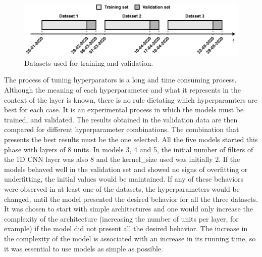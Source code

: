 \begin{figure}[h!]
    \centering
    \begin{center}
    \includegraphics[width=1\textwidth]{Images/hyptun.png}
    \caption{Datasets used for training and validation.}
    \label{hyptun}
    \end{center}
\end{figure}

The process of tuning hyperparators is a long and time consuming process. Although the meaning of each hyperparameter and what it represents in the context of the layer is known, there is no rule dictating which hyperparamters are best for each case. It is an experimental process in which the models must be trained, and validated. The results obtained in the validation data are then compared for different hyperparameter combinations. The combination that presents the best results must be the one selected. All the five models started this phase with layers of 8 units. In models 3, 4 and 5, the initial number of filters of the \ac{1D CNN} layer was also 8 and the kernel\_size used was initially 2. If the models behaved well in the validation set and showed no signs of overfitting or underfitting, the initial values would be maintained. If any of these behaviors were observed in at least one of the datasets, the hyperparameters would be changed, until the model presented the desired behavior for all the three datasets. It was chosen to start with simple architectures and one would only increase the complexity of the architecture (increasing the number of units per layer, for example) if the model did not present all the desired behavior. The increase in the complexity of the model is associated with an increase in its running time, so it was essential to use models as simple as possible. 


